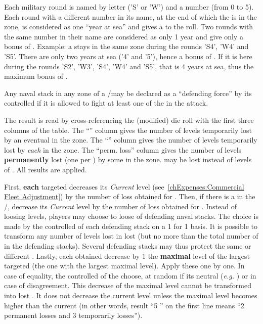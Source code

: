 \bparag Each military round is named by letter ('S' or 'W') and a number (from
0 to 5).
\bparag Each round with a different number in its name, at the end of which
the \corsaire is in the zone, is considered as one ``year at sea'' and gives a
 to the roll.
\bparag Two rounds with the same number in their name are considered as only 1
year and give only a bonus of .
\bparag Example: a \corsaire stays in the same zone during the rounds 'S4',
'W4' and 'S5'. There are only two years at sea ('4' and '5'), hence a bonus of
. If it is here during the rounds 'S2', 'W3', 'S4', 'W4' and 'S5',
that is 4 years at sea, thus the maximum bonus of .

 Any naval stack in any zone of a \STZ/\CTZ may
be declared as a ``defending force'' by its controlled if it is allowed to
fight at least one of the \corsaire in the attack.


\bparag The result is read by cross-referencing the (modified) die roll with
the first three columns of the table.
\bparag The ``\TradeFLEET\faceplus'' column gives the number of levels
temporarily lost by an eventual \TradeFLEET\faceplus in the zone.
\bparag The ``\TradeFLEET\facemoins'' column gives the number of levels
temporarily lost by \emph{each} \TradeFLEET\facemoins in the zone.
\bparag The ``perm. loss'' column gives the number of levels
\textbf{permanently} lost (one per \textetoile) by some \TradeFLEET in the
zone.
\bparag \ND may be lost instead of levels of \TradeFLEET.
\bparag All results are applied.


\bparag First, \textbf{each} targeted \TradeFLEET\facemoins decreases its
\emph{Current} level (see~\ref{chExpenses:Commercial Fleet Adjustment}) by the
number of loss obtained for \TradeFLEET\facemoins.
\bparag Then, if there is a \TradeFLEET\faceplus in the \STZ/\CTZ, decrease
its \emph{Current} level by the number of loss obtained for
\TradeFLEET\faceplus.
\bparag Instead of loosing \TradeFLEET levels, players may choose to loose \ND
of defending naval stacks. The choice is made by the controlled of each
defending stack on a 1 for 1 basis. It is possible to transform any number of
levels lost in \ND lost (but no more than the total number of \ND in the
defending stacks). Several defending stacks may thus protect the same or
different \TradeFLEET.
\bparag Lastly, each \textetoile obtained decrease by 1 the \textbf{maximal}
level of the largest targeted \TradeFLEET (the one with the largest maximal
level). Apply these \textetoile one by one. In case of equality, the
controlled of the \corsaire choose, at random if its neutral (\emph{e.g.}
) or in case of disagreement.
\bparag This decrease of the maximal level cannot be transformed into lost
\ND. It does not decrease the current level unless the maximal level becomes
higher than the current (in other words, result ``5 \textetoile\textetoile''
on the first line means ``2 permanent losses and 3 temporarily losses'').

